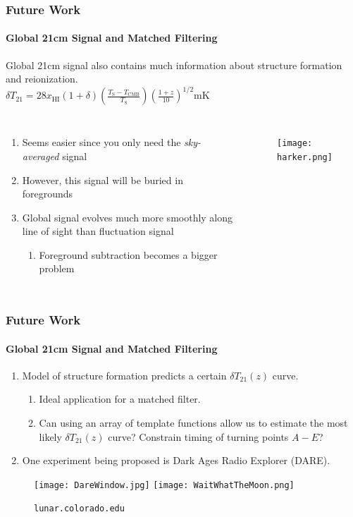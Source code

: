 \documentclass{beamer}
\begin{document}
\begin{frame}
\frametitle{Future Work}
\framesubtitle{Global 21cm Signal and Matched Filtering}
Global 21cm signal also contains much information about structure formation and reionization.\\
$\delta T_{21} = 28 x_{\text{HI}}(1+\delta) \left( \frac{T_{\text{S}} - T_{\text{CMB}}}{T_{\text{S}}} \right)\left( \frac{1+z}{10} \right)^{1/2}\text{mK}$
\begin{columns}[l]
\column{2.3in}
\begin{enumerate}[-]
\item Seems easier since you only need the \textit{sky-averaged} signal
\item However, this signal will be buried in foregrounds
\item Global signal evolves much more smoothly along line of sight than fluctuation signal
\begin{enumerate}[$\to$]
\item Foreground subtraction becomes a bigger problem
\end{enumerate}
\end{enumerate} 
\column{1.8in}
\begin{figure}[h]
  \centering
  \texttt{[image: harker.png]}
  \caption{{\tiny \cite{Harker:2011et}}}
\end{figure}
\end{columns}
\end{frame}

\begin{frame}
\frametitle{Future Work}
\framesubtitle{Global 21cm Signal and Matched Filtering}
\begin{enumerate}[-]
\item Model of structure formation predicts a certain $\delta T_{21}(z)$ curve.
\begin{enumerate}[$\to$]
\item Ideal application for a matched filter.
\item Can using an array of template functions allow us to estimate the most likely $\delta T_{21}(z)$ curve? Constrain timing of turning points $A-E$?
\end{enumerate}
\item One experiment being proposed is Dark Ages Radio Explorer (DARE).
\end{enumerate}
\begin{figure}[h]
  \centering
  \texttt{[image: DareWindow.jpg]}
  \texttt{[image: WaitWhatTheMoon.png]}
  \caption{{\tt lunar.colorado.edu}}
  \label{fig:todo}
\end{figure}
\end{frame}
\end{document}
